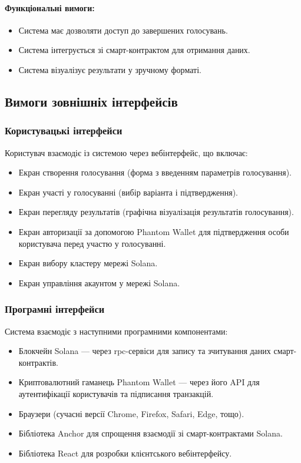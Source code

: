\documentclass[14pt]{extreport}
\newcounter{req}[subsubsection]
\newcommand\req{\arabic{req}\stepcounter{req}}
\begin{document}
  \paragraph{Функціональні вимоги:}  
  \begin{itemize}[leftmargin=*,label=REQ-.\req:]  
      \item Система має дозволяти доступ до завершених голосувань.  
      \item Система інтегрується зі смарт-контрактом для отримання даних.  
      \item Система візуалізує результати у зручному форматі.
  \end{itemize}  

  \subsection{Вимоги зовнішніх інтерфейсів}
  \subsubsection{Користувацькі інтерфейси}
  Користувач взаємодіє із системою через вебінтерфейс, що включає:
  \begin{itemize}
    \item Екран створення голосування (форма з введенням параметрів голосування).
    \item Екран участі у голосуванні (вибір варіанта і підтвердження).
    \item Екран перегляду результатів (графічна візуалізація результатів голосування).
    \item Екран авторизації за допомогою Phantom Wallet для підтвердження особи користувача перед участю у голосуванні.
    \item Екран вибору кластеру мережі Solana.
    \item Екран управління акаунтом у мережі Solana.
  \end{itemize}
  
  \subsubsection{Програмні інтерфейси}
  Система взаємодіє з наступними програмними компонентами:
  \begin{itemize}
    \item Блокчейн Solana — через \gls{rpc}-сервіси для запису та зчитування даних смарт-контрактів.
    \item Криптовалютний гаманець Phantom Wallet — через його API для аутентифікації користувачів та підписання транзакцій.
    \item Браузери (сучасні версії Chrome, Firefox, Safari, Edge, тощо).
    \item Бібліотека Anchor для спрощення взаємодії зі смарт-контрактами Solana.
    \item Бібліотека React для розробки клієнтського вебінтерфейсу.
  \end{itemize}
  
\end{document}
